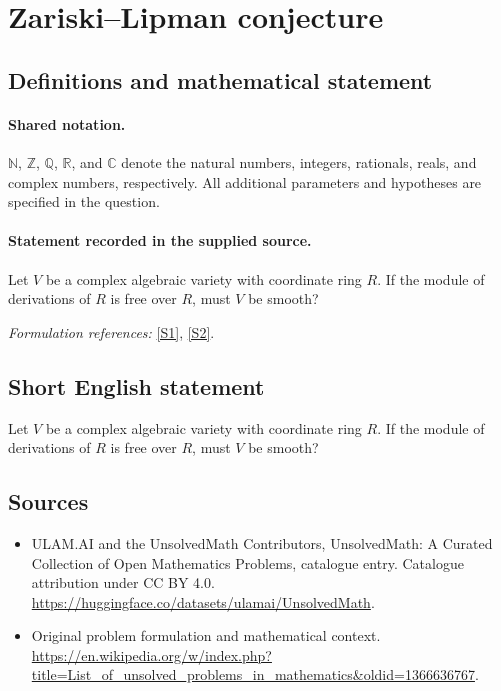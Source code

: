 \documentclass[11pt]{article}
\newcommand{\sref}[2]{\hyperlink{source:#1:#2}{[S#2]}}
\begin{document}
\section{Zariski–Lipman conjecture}\label{statement}

\subsection{Definitions and mathematical statement}

\paragraph{Shared notation.}$\mathbb N$, $\mathbb Z$, $\mathbb Q$, $\mathbb R$, and $\mathbb C$ denote the natural numbers, integers, rationals, reals, and complex numbers, respectively. All additional parameters and hypotheses are specified in the question.


\paragraph{Statement recorded in the supplied source.}
Let $V$ be a complex algebraic variety with coordinate ring $R$. If the module of derivations of $R$ is free over $R$, must $V$ be smooth?
\par\smallskip\textit{Formulation references:} \sref{statement}{1}, \sref{statement}{2}.
\subsection{Short English statement}
Let $V$ be a complex algebraic variety with coordinate ring $R$. If the module of derivations of $R$ is free over $R$, must $V$ be smooth?
\subsection{Sources}
\begin{itemize}
\item[\hypertarget{source:statement:1}{S1}] ULAM.AI and the UnsolvedMath Contributors, UnsolvedMath: A Curated Collection of Open Mathematics Problems, catalogue entry. Catalogue attribution under CC BY 4.0.
\url{https://huggingface.co/datasets/ulamai/UnsolvedMath}.
\item[\hypertarget{source:statement:2}{S2}] Original problem formulation and mathematical context.
\url{https://en.wikipedia.org/w/index.php?title=List_of_unsolved_problems_in_mathematics&oldid=1366636767}.
\end{itemize}
\label{end:statement}
\end{document}
